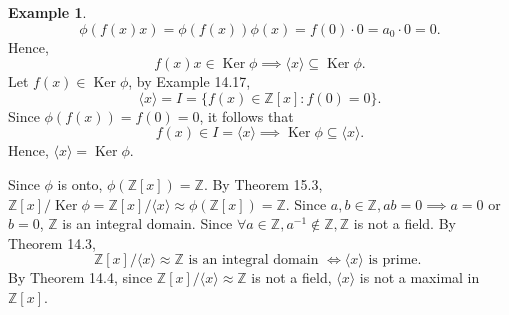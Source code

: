 \documentclass{article}
\theoremstyle{definition}
\newtheorem{example}{Example}[section]
\DeclareMathOperator{\Ker}{Ker}
\begin{document}
\begin{example}
\begin{equation*}
        \phi(f(x)x)=\phi(f(x))\phi(x)=f(0)\cdot0=a_0\cdot0=0.
    \end{equation*}
    Hence,
    \begin{equation*}
        f(x)x\in\Ker\phi \implies \langle x\rangle \subseteq\Ker\phi.
    \end{equation*}
    Let $f(x)\in\Ker\phi$, by Example 14.17,
    \begin{equation*}
        \langle x \rangle = I = \{f(x)\in\mathbb{Z}[x]:f(0)=0\}.
    \end{equation*}
    Since $\phi(f(x))=f(0)=0$, it follows that
    \begin{equation*}
        f(x)\in I =\langle x \rangle \implies \Ker\phi\subseteq\langle x \rangle.
    \end{equation*}
    Hence, $\langle x \rangle = \Ker\phi$.
    
    Since $\phi$ is onto, $\phi(\mathbb{Z}[x])=\mathbb{Z}$. By Theorem 15.3, $\mathbb{Z}[x]/\Ker\phi=\mathbb{Z}[x]/\langle x\rangle\approx\phi(\mathbb{Z}[x])=\mathbb{Z}$. Since $a,b\in\mathbb{Z},ab=0\implies a=0$ or $b=0$, $\mathbb{Z}$ is an integral domain. Since $\forall a \in \mathbb{Z}, a^{-1}\notin \mathbb{Z}, \mathbb{Z}$ is not a field. By Theorem 14.3,
    \begin{equation*}
        \mathbb{Z}[x]/\langle x\rangle\approx \mathbb{Z}\text{ is an integral domain } \iff \langle x \rangle \text{ is prime. }
    \end{equation*}
    By Theorem 14.4, since $\mathbb{Z}[x]/\langle x\rangle \approx\mathbb{Z}$ is not a field, $\langle x\rangle$ is not a maximal in $\mathbb{Z}[x]$.
\end{example}
\end{document}
